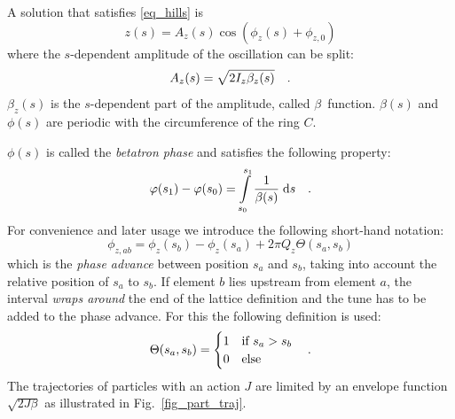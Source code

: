 A solution that satisfies \eqref{eq_hills} is
%
\begin{equation}
    z(s) = A_z(s) \cos\left(\phi_z(s) + \phi_{z,0} \right)
    \label{eq_betatron_osc}
\end{equation}
%
where the $s$-dependent amplitude of the oscillation can be split:
%
\begin{equation}
    A_z(s) = \sqrt{2I_z \beta_z(s)}
    \quad .
    \label{eq_betatron_ampl}
\end{equation}
%
$\beta_z(s)$ is the $s$-dependent part of the amplitude, called $\beta$~function.
$\beta(s)$ and $\phi(s)$ are periodic with the circumference of the ring $C$.

$\phi(s)$ is called the \emph{betatron phase} and satisfies the following property:
%
\begin{equation}
    \varphi(s_1) - \varphi(s_0) = \int\limits_{s_0}^{s_1} \frac{1}{\beta(s)}\;\text{d} s
    \quad .
    \label{eq_phase}
\end{equation}
%
For convenience and later usage we introduce the following short-hand notation:
%
\begin{equation}
    \phi_{z,ab} = \phi_z(s_b) - \phi_z(s_a) + 2\pi Q_z \Theta(s_a, s_b)
\end{equation}
%
which is the \emph{phase advance} between position $s_a$ and $s_b$, taking into
account the relative position of $s_a$ to $s_b$.
If element $b$ lies upstream from element $a$, the interval \emph{wraps around} the end of the
lattice definition and the tune
has to be added to the phase advance. For this the following definition is used:
%
\begin{equation}
    \Theta(s_a, s_b) =
    \begin{cases}
        1 & \text{if } s_a > s_b \\
        0 & \text{else} \\
    \end{cases}
    \quad .
\end{equation}
%
The trajectories of particles with an action $J$ are limited by an envelope function $\sqrt{2J\beta}$
as illustrated in Fig.~\ref{fig_part_traj}.
%
